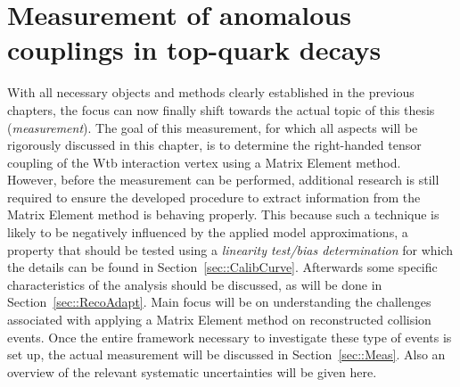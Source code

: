 \chapter{Measurement of anomalous couplings in top-quark decays} \label{ch::Analysis}

With all necessary objects and methods clearly established in the previous chapters, the focus can now finally shift towards the actual topic of this thesis (\textit{measurement}).
The goal of this measurement, for which all aspects will be rigorously discussed in this chapter, is to determine the right-handed tensor coupling of the Wtb interaction vertex using a Matrix Element method.
\\

However, before the measurement can be performed, additional research is still required to ensure the developed procedure to extract information from the Matrix Element method is behaving properly. This because such a technique is likely to be negatively influenced by the applied model approximations, a property that should be tested using a \textit{linearity test/bias determination} for which the details can be found in Section~\ref{sec::CalibCurve}.
Afterwards some specific characteristics of the analysis should be discussed, as will be done in Section~\ref{sec::RecoAdapt}.
Main focus will be on understanding the challenges associated with applying a Matrix Element method on reconstructed collision events.
Once the entire framework necessary to investigate these type of events is set up, the actual measurement will be discussed in Section~\ref{sec::Meas}. Also an overview of the relevant systematic uncertainties will be given here.

